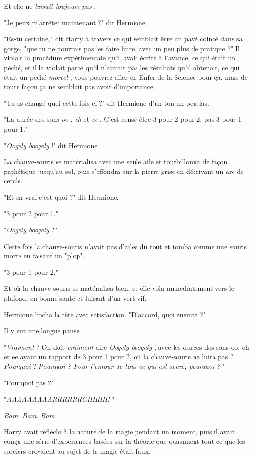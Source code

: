 Et elle ne \emph{luisait toujours pas} .

"Je peux m'arrêter maintenant ?" dit Hermione.

"Es-tu certaine," dit Harry à travers ce qui semblait être un pavé coincé dans sa gorge, "que tu ne pourrais pas les faire luire, avec un peu plus de pratique ?" Il violait la procédure expérimentale qu'il avait écrite à l'avance, ce qui était un péché, et il la violait parce qu'il n'aimait pas les résultats qu'il obtenait, ce qui était un péché \emph{mortel} , vous pouviez aller en Enfer de la Science pour ça, mais de toute façon ça ne semblait pas avoir d'importance.

"Tu as changé quoi cette fois-ci ?" dit Hermione d'un ton un peu las.

"La durée des sons \emph{oo} , \emph{eh}  et \emph{ee} . C'est censé être 3 pour 2 pour 2, pas 3 pour 1 pour 1."

"\emph{Oogely boogely}  !" dit Hermione.

La chauve-souris se matérialisa avec une seule aile et tourbillonna de façon pathétique jusqu'au sol, puis s'effondra sur la pierre grise en décrivant un arc de cercle.

"Et en vrai c'est quoi ?" dit Hermione.

"3 pour 2 pour 1."

"\emph{Oogely boogely !"} 

Cette fois la chauve-souris n'avait pas d'ailes du tout et tomba comme une souris morte en faisant un "plop".

"3 pour 1 pour 2."

Et oh la chauve-souris se matérialisa bien, et elle vola immédiatement vers le plafond, en bonne santé et luisant d'un vert vif.

Hermione hocha la tête avec satisfaction. "D'accord, quoi ensuite ?"

Il y eut une longue pause.

"\emph{Vraiment } ? On doit \emph{vraiment}  dire \emph{Oogely boogely} , avec les durées des sons oo, eh et ee ayant un rapport de 3 pour 1 pour 2, ou la chauve-souris ne luira pas ? \emph{Pourquoi}  ? \emph{Pourquoi}  \emph{? Pour l'amour de tout ce qui est sacré, pourquoi ?} "

"Pourquoi pas ?"

"\emph{AAAAAAAAARRRRRRGHHHH!} "

\emph{Bam. Bam. Bam.} 

Harry avait réfléchi à la nature de la magie pendant un moment, puis il avait conçu une série d'expériences basées sur la théorie que quasiment tout ce que les sorciers croyaient au sujet de la magie était faux.

